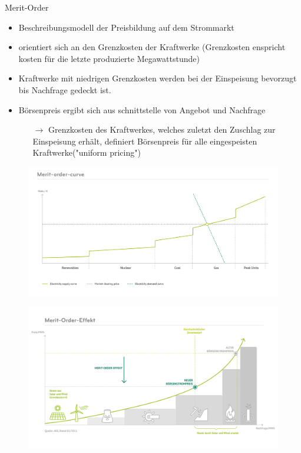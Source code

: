 \documentclass[aspectratio=1610, professionalfonts, 9pt]{beamer}
\begin{document}
\begin{frame}{Merit-Order}
\begin{itemize}
  \item Beschreibungsmodell der Preisbildung auf dem Strommarkt
  \item orientiert sich an den Grenzkosten der Kraftwerke
  (Grenzkosten enspricht kosten für die letzte produzierte Megawattstunde)
\item Kraftwerke mit niedrigen Grenzkosten werden bei der
 Einspeisung bevorzugt bis Nachfrage gedeckt ist.
\item Börsenpreis ergibt sich aus schnittstelle von Angebot und Nachfrage
\begin{itemize}
  \item[$\rightarrow$] Grenzkosten des Kraftwerkes, welches zuletzt den
  Zuschlag zur Einspeisung erhält, definiert Börsenpreis für alle eingespeisten Kraftwerke("uniform pricing")
\end{itemize}
\end{itemize}
\end{frame}

{
\begin{frame}
  \begin{figure}
  \includegraphics[width=1\textwidth]{images/Merit-order-curve-2.jpg}
\end{figure}
\end{frame}
}

{
\begin{frame}
  \begin{figure}
  \includegraphics[width=1\textwidth]{images/Merit.png}
\end{figure}
\end{frame}
}
\end{document}
